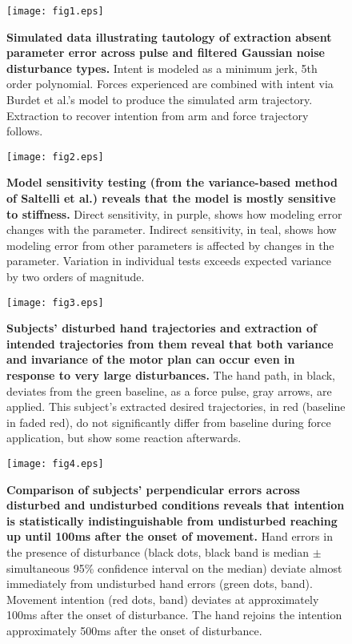 \documentclass[10pt]{article}
\begin{document}
\begin{figure}[!ht]
\begin{center}
\texttt{[image: fig1.eps]}
\end{center}
\caption{
{\bf Simulated data illustrating tautology of extraction absent parameter error across pulse and filtered Gaussian noise disturbance types.} Intent is modeled as a minimum jerk, 5th order polynomial. Forces experienced are combined with intent via Burdet et al.'s \cite{burdet2006stability} model to produce the simulated arm trajectory. Extraction to recover intention from arm and force trajectory follows.
}
\label{fig:synthetic}
\end{figure}

\begin{figure}[!ht]
\begin{center}
\texttt{[image: fig2.eps]}
\end{center}
\caption{
{\bf Model sensitivity testing (from the variance-based method of Saltelli et al.\cite{saltelli2010variance}) reveals that the model is mostly sensitive to stiffness.} Direct sensitivity, in purple, shows how modeling error changes with the parameter. Indirect sensitivity, in teal, shows how modeling error from other parameters is affected by changes in the parameter. Variation in individual tests exceeds expected variance by two orders of magnitude.
}
\label{fig:sensitivity}
\end{figure}

\begin{figure}[!ht]
\begin{center}
\texttt{[image: fig3.eps]}
\end{center}
\caption{
{\bf Subjects' disturbed hand trajectories and extraction of intended trajectories from them reveal that both variance and invariance of the motor plan can occur even in response to very large disturbances.} The hand path, in black, deviates from the green baseline, as a force pulse, gray arrows, are applied. This subject's extracted desired trajectories, in red (baseline in faded red), do not significantly differ from baseline during force application, but show some reaction afterwards.
}
\label{fig:anecdotes}
\end{figure}

\begin{figure}[!ht]
\begin{center}
\texttt{[image: fig4.eps]}
\end{center}
\caption{
{\bf Comparison of subjects' perpendicular errors across disturbed and undisturbed conditions reveals that intention is statistically indistinguishable from undisturbed reaching up until 100ms after the onset of movement.} Hand errors in the presence of disturbance (black dots, black band is median $\pm$ simultaneous 95\% confidence interval on the median) deviate almost immediately from undisturbed hand errors (green dots, band). Movement intention (red dots, band) deviates at approximately 100ms after the onset of disturbance. The hand rejoins the intention approximately 500ms after the onset of disturbance.
}
\label{fig:grouptrends}
\end{figure}
\end{document}
